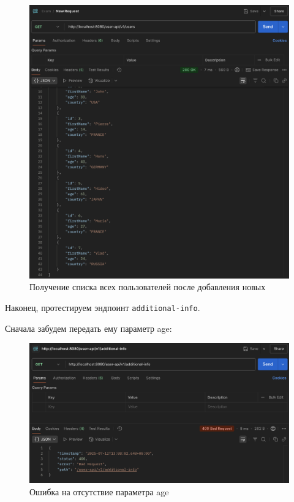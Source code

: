 \documentclass[a4paper, 14pt]{article}
\begin{document}
\begin{figure}[H]
	\centering
	\includegraphics[width=15cm]{resources/8.png}
	\caption{Получение списка всех пользователей после добавления новых}
\end{figure}

Наконец, протестируем эндпоинт \texttt{additional-info}.

Сначала забудем передать ему параметр age:

\begin{figure}[H]
	\centering
	\includegraphics[width=15cm]{resources/9.png}
	\caption{Ошибка на отсутствие параметра age}
\end{figure}
\end{document}
